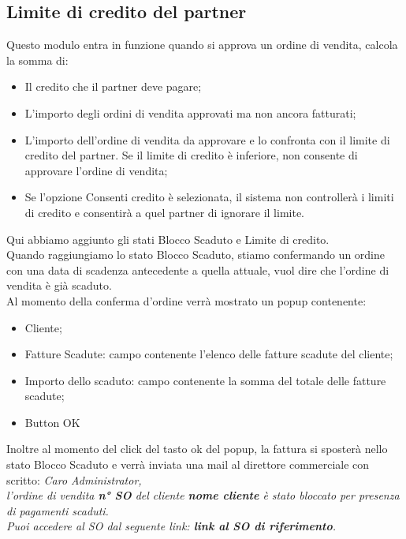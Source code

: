 \subsection{Limite di credito del partner}
Questo modulo entra in funzione quando si approva un ordine di vendita, calcola la somma di:
\begin{itemize}
\item Il credito che il partner deve pagare;
\item L'importo degli ordini di vendita approvati ma non ancora fatturati;
\item L'importo dell'ordine di vendita da approvare e lo confronta con il limite di credito del partner. Se il limite di credito è inferiore, non consente di approvare l'ordine di vendita;
\item Se l'opzione Consenti credito è selezionata, il sistema non controllerà i limiti di credito e consentirà a quel partner di ignorare il limite.
\end{itemize}
\vspace*{0.5cm}
Qui abbiamo aggiunto gli stati Blocco Scaduto e Limite di credito.\\
Quando raggiungiamo lo stato Blocco Scaduto, stiamo confermando un ordine con una data di scadenza antecedente a quella attuale, vuol dire che l'ordine di vendita è già scaduto.\\
Al momento della conferma d'ordine verrà mostrato un popup contenente:\\
\begin{itemize}
	\item Cliente;
	\item Fatture Scadute: campo contenente l'elenco delle fatture scadute del cliente;
	\item Importo dello scaduto: campo contenente la somma del totale delle fatture scadute;
	\item Button OK
\end{itemize}

Inoltre al momento del click del tasto ok del popup, la fattura si sposterà nello stato Blocco Scaduto e verrà inviata una mail al direttore commerciale con scritto:\vspace*{0.5cm}
\textit{Caro Administrator,\\
l'ordine di vendita \textbf{n° SO} del cliente \textbf{nome cliente} è stato bloccato per presenza di pagamenti scaduti.\\
Puoi accedere al SO dal seguente link: \textbf{link al SO di riferimento}.}


